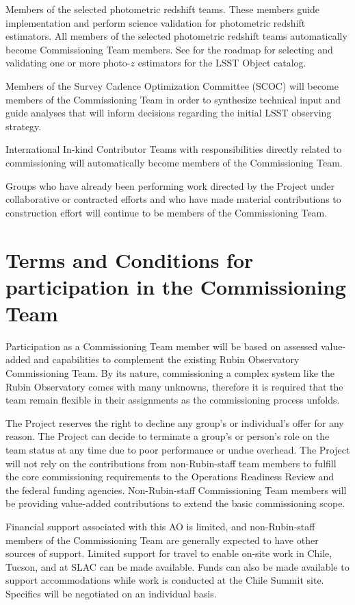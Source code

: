 \documentclass[SE,authoryear,toc,lsstdraft]{lsstdoc}
\begin{document}
Members of the selected photometric redshift teams. These members guide implementation and perform science validation for photometric redshift estimators. All members of the selected photometric redshift teams automatically become Commissioning Team members. See  for the roadmap for selecting and validating one or more photo-$z$ estimators for the LSST Object catalog.  

Members of the Survey Cadence Optimization Committee (SCOC) will become members of the Commissioning Team in order to synthesize technical input and guide analyses that will inform decisions regarding the initial LSST observing strategy. 

International In-kind Contributor Teams with responsibilities directly related to commissioning will automatically become members of the Commissioning Team.

Groups who have already been performing work directed by the Project under collaborative or contracted efforts and who have made material contributions to construction effort will continue to be members of the Commissioning Team. 

\section{Terms and Conditions for participation in the Commissioning Team}
\label{terms}

Participation as a Commissioning Team member will be based on assessed value-added and capabilities to complement the existing Rubin Observatory Commissioning Team. By its nature, commissioning a complex system like the Rubin Observatory comes with many unknowns, therefore it is required that the team remain flexible in their assignments as the commissioning process unfolds. 

The Project reserves the right to decline any group's or individual's offer for any reason.  The Project can decide to terminate a group's or person's role on the team status at any time due to poor performance or undue overhead. The Project will not rely on the contributions from non-Rubin-staff team members to fulfill the core commissioning requirements to the Operations Readiness Review and the federal funding agencies. Non-Rubin-staff Commissioning Team members will be providing value-added contributions to extend the basic commissioning scope.

Financial support associated with this AO is limited, and non-Rubin-staff members of the Commissioning Team are generally expected to have other sources of support. Limited support for travel to enable on-site work in Chile, Tucson, and at SLAC can be made available.  Funds can also be made available to support accommodations while work is conducted at the Chile Summit site. Specifics will be negotiated on an individual basis.
\end{document}
